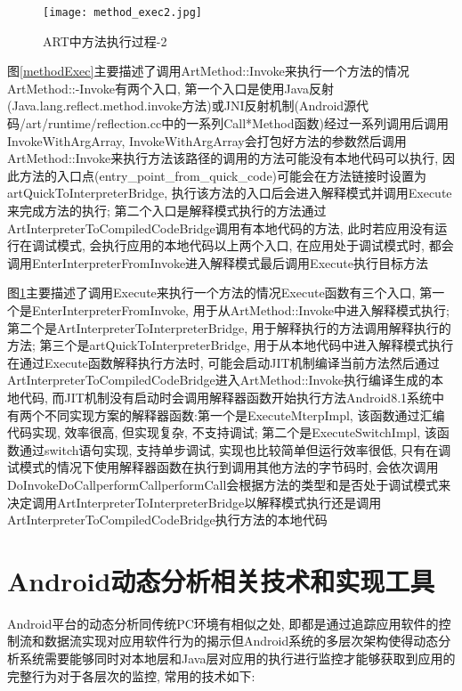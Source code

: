 \begin{figure}[ht]
	\centering
	\texttt{[image: method\_exec2.jpg]}
	\caption{ART中方法执行过程-2}
	\label{methodExec2}
\end{figure}
图\ref{methodExec}主要描述了调用ArtMethod::Invoke来执行一个方法的情况\juhao ArtMethod::-Invoke有两个入口, 第一个入口是使用Java反射(Java.lang.reflect.method.invoke方法)或JNI反射机制(Android源代码/art/runtime/reflection.cc中的一系列Call*Method函数)经过一系列调用后调用InvokeWithArgArray,  InvokeWithArgArray会打包好方法的参数然后调用ArtMethod::Invoke来执行方法\juhao 该路径的调用的方法可能没有本地代码可以执行, 因此方法的入口点(entry\_point\_from\_quick\_code)可能会在方法链接时设置为artQuickToInterpreterBridge, 执行该方法的入口后会进入解释模式并调用Execute来完成方法的执行; 第二个入口是解释模式执行的方法通过ArtInterpreterToCompiledCodeBridge调用有本地代码的方法, 此时若应用没有运行在调试模式, 会执行应用的本地代码\juhao 以上两个入口, 在应用处于调试模式时, 都会调用EnterInterpreterFromInvoke进入解释模式最后调用Execute执行目标方法\juhao 

图\ref{methodExec2}主要描述了调用Execute来执行一个方法的情况\juhao Execute函数有三个入口, 第一个是EnterInterpreterFromInvoke, 用于从ArtMethod::Invoke中进入解释模式执行; 第二个是ArtInterpreterToInterpreterBridge, 用于解释执行的方法调用解释执行的方法; 第三个是artQuickToInterpreterBridge, 用于从本地代码中进入解释模式执行\juhao
在通过Execute函数解释执行方法时, 可能会启动JIT机制编译当前方法然后通过ArtInterpreterToCompiledCodeBridge进入ArtMethod::Invoke执行编译生成的本地代码, 而JIT机制没有启动时会调用解释器函数开始执行方法\juhao Android8.1系统中有两个不同实现方案的解释器函数:第一个是ExecuteMterpImpl, 该函数通过汇编代码实现, 效率很高, 但实现复杂, 不支持调试; 第二个是ExecuteSwitchImpl, 该函数通过switch语句实现, 支持单步调试, 实现也比较简单但运行效率很低, 只有在调试模式的情况下使用\juhao 解释器函数在执行到调用其他方法的字节码时, 会依次调用DoInvoke\dunhao DoCall\dunhao performCall\juhao performCall会根据方法的类型和是否处于调试模式来决定调用ArtInterpreterToInterpreterBridge以解释模式执行还是调用ArtInterpreterToCompiledCodeBridge执行方法的本地代码\juhao 


\section{Android动态分析相关技术和实现工具}
Android平台的动态分析同传统PC环境有相似之处, 即都是通过追踪应用软件的控制流和数据流实现对应用软件行为的揭示\juhao 但Android系统的多层次架构使得动态分析系统需要能够同时对本地层和Java层对应用的执行进行监控才能够获取到应用的完整行为\juhao 对于各层次的监控, 常用的技术如下:

